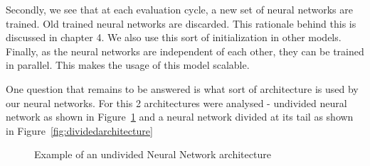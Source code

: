 \documentclass[12pt, twoside, ngerman]{report}
\begin{document}
Secondly,  we see that at each evaluation cycle,  a new set of neural networks are trained.
Old trained neural networks are discarded.
This rationale behind this is discussed in chapter 4.
We also use this sort of initialization in other models.
Finally,  as the neural networks are independent of each other,  they can be trained in parallel.
This makes the usage of this model scalable.

One question that remains to be answered is what sort of architecture is used by our neural networks.
For this 2 architectures were analysed - undivided neural network as shown in Figure~\ref{fig:undividedarchitecture} and a neural network divided at its tail as shown in Figure~\ref{fig:dividedarchitecture}
\begin{figure}[htb]
\centering
{}
\caption{Example of an undivided Neural Network architecture}
\label{fig:undividedarchitecture}
\end{figure}
\end{document}
